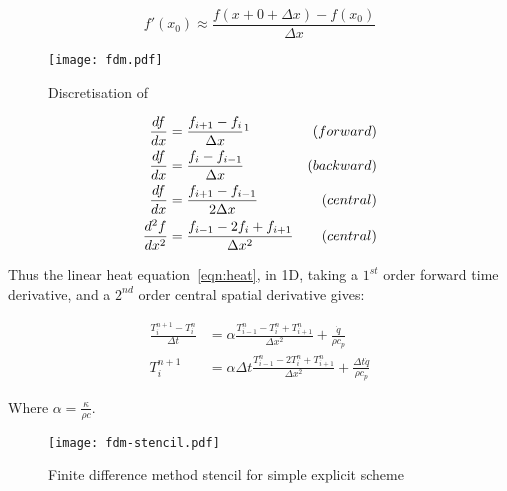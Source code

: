 \begin{equation}
f'(x_0) \approx \frac{f(x+0+\Delta x)-f(x_0)}{\Delta x}
\label{eqn:fdmfisrt}
\end{equation}

\begin{figure}
  \begin{center}
    \texttt{[image: fdm.pdf]}
  \end{center}
  \caption{Discretisation of }\label{fig:fdmexplain}

\end{figure}

\begin{subequations}
\begin{align}
\frac{df}{dx} &= \frac{f_{i+1} - f_{i}}{\Delta x}\footnotemark  &(forward) \label{eqn:fdmfwd}\\
\frac{df}{dx} &= \frac{f_{i} - f_{i-1}}{\Delta x}  &(backward) \label{eqn:fdmbck}\\
\frac{df}{dx} &= \frac{f_{i+1} - f_{i-1}}{2\Delta x}  &(central)\label{eqn:fdmcent}\\
\frac{d^2f}{dx^2} &= \frac{f_{i-1}-2f_i+f_{i+1}}{\Delta x^2} &(central)\label{eqn:fdmcent2}
\end{align}
\end{subequations}

Thus the linear heat equation~\cref{eqn:heat}, in 1D, taking a $1^{st}$ order forward time derivative, and a $2^{nd}$ order central spatial derivative gives:

\begin{subequations}
\begin{align}
\frac{T^{n+1}_i-T^{n}_i}{\Delta t} &= \alpha\frac{T^n_{i-1}-T^n_{i}+T^n_{i+1}}{\Delta x^2}  + \frac{\dot{q}}{\rho c_p}\\
T_{i}^{n+1} &=  \alpha\Delta t \frac{T_{i-1}^n-2T_i^n+T_{i+1}^n}{\Delta x^2} + \frac{\Delta t\dot{q}}{\rho c_p}
\label{eqn:simplefdm}
\end{align}
\end{subequations}

Where $\alpha=\tfrac{\kappa}{\rho c}$.

\begin{figure}
  \begin{center}
    \texttt{[image: fdm-stencil.pdf]}
  \end{center}
  \caption{Finite difference method stencil for simple explicit scheme}\label{fig:fdmstencil}
\end{figure}

